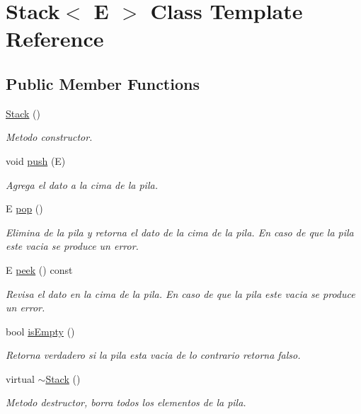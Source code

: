\hypertarget{class_stack}{\section{Stack$<$ E $>$ Class Template Reference}
\label{class_stack}
}
\subsection*{Public Member Functions}
\begin{DoxyCompactItemize}
\item 
\hypertarget{class_stack_a561be1726ac9649a9ee3f80a4ca8e4b5}{\hyperlink{class_stack_a561be1726ac9649a9ee3f80a4ca8e4b5}{Stack} ()}\label{class_stack_a561be1726ac9649a9ee3f80a4ca8e4b5}

\begin{DoxyCompactList}\small\item\em Metodo constructor. \end{DoxyCompactList}\item 
void \hyperlink{class_stack_af71e3e142fba5bb861b66b4882289b31}{push} (E)
\begin{DoxyCompactList}\small\item\em Agrega el dato a la cima de la pila. \end{DoxyCompactList}\item 
E \hyperlink{class_stack_a5ba7a4c8eec39757e28f95da49f06d52}{pop} ()
\begin{DoxyCompactList}\small\item\em Elimina de la pila y retorna el dato de la cima de la pila. En caso de que la pila este vacia se produce un error. \end{DoxyCompactList}\item 
E \hyperlink{class_stack_a19a17240bf7045cf6a3a9497e1091433}{peek} () const 
\begin{DoxyCompactList}\small\item\em Revisa el dato en la cima de la pila. En caso de que la pila este vacia se produce un error. \end{DoxyCompactList}\item 
bool \hyperlink{class_stack_a0ce2804f35c0c8cfb999535f35fa438b}{is\-Empty} ()
\begin{DoxyCompactList}\small\item\em Retorna verdadero si la pila esta vacia de lo contrario retorna falso. \end{DoxyCompactList}\item 
\hypertarget{class_stack_ad08e4c32f07b8d967913f8b1a45f8620}{virtual \hyperlink{class_stack_ad08e4c32f07b8d967913f8b1a45f8620}{$\sim$\-Stack} ()}\label{class_stack_ad08e4c32f07b8d967913f8b1a45f8620}

\begin{DoxyCompactList}\small\item\em Metodo destructor, borra todos los elementos de la pila. \end{DoxyCompactList}\end{DoxyCompactItemize}


